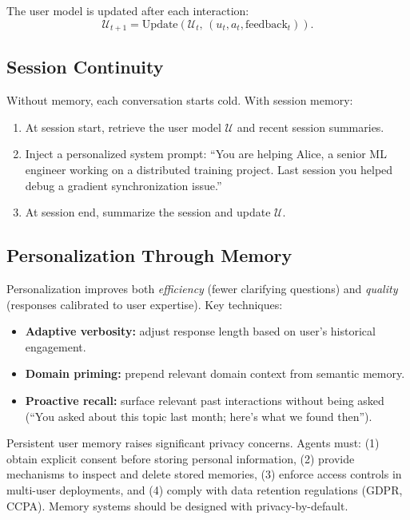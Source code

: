 The user model is updated after each interaction: 
\[
\mathcal{U}_{t+1} = \text{Update}(\mathcal{U}_t,\, (u_t, a_t, \text{feedback}_t)).
\]

\subsection{Session Continuity}
\label{session-continuity}

Without memory, each conversation starts cold. With session memory:

\begin{enumerate}
  \item At session start, retrieve the user model $\mathcal{U}$ and recent session summaries.
  \item Inject a personalized system prompt: ``You are helping Alice, a senior ML engineer working on a distributed training project. Last session you helped debug a gradient synchronization issue.''
  \item At session end, summarize the session and update $\mathcal{U}$.
\end{enumerate}

\subsection{Personalization Through Memory}
\label{personalization-through-memory}

Personalization improves both \emph{efficiency} (fewer clarifying questions) and \emph{quality} (responses calibrated to user expertise). Key techniques:

\begin{itemize}
  \item \textbf{Adaptive verbosity:} adjust response length based on user’s historical engagement.
  \item \textbf{Domain priming:} prepend relevant domain context from semantic memory.
  \item \textbf{Proactive recall:} surface relevant past interactions without being asked (``You asked about this topic last month; here’s what we found then'').
\end{itemize}

\begin{warningbox}
Persistent user memory raises significant privacy concerns. Agents must: (1) obtain explicit consent before storing personal information, (2) provide mechanisms to inspect and delete stored memories, (3) enforce access controls in multi-user deployments, and (4) comply with data retention regulations (GDPR, CCPA). Memory systems should be designed with privacy-by-default.
\end{warningbox}

